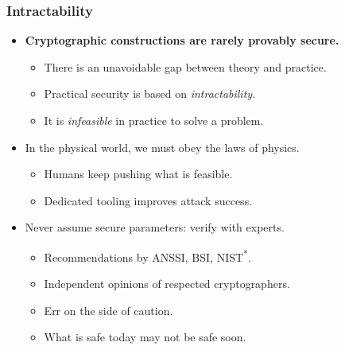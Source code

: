 \begin{frame}
  \frametitle{Intractability}

  \begin{itemize}
    \item \textbf{Cryptographic constructions are rarely provably secure.}
    \pause
    \begin{itemize}[<+->]
      \item There is an unavoidable gap between theory and practice.
      \item Practical security is based on \emph{intractability}.
      \item It is \emph{infeasible} in practice to solve a problem.
    \end{itemize}

    \vspace*{1em}

    \pause
    \item In the physical world, we must obey the laws of physics.
    \begin{itemize}
      \item Humans keep pushing what is feasible.
      \item Dedicated tooling improves attack success.
    \end{itemize}
    
    \vspace*{1em}

    \pause
    \item Never assume secure parameters: verify with experts.
    \begin{itemize}[<+->]
      \item Recommendations by ANSSI, BSI, NIST\textsuperscript{*}.
      \item Independent opinions of respected cryptographers.
      \item Err on the side of caution.
      \item What is safe today may not be safe soon.
    \end{itemize}
  \end{itemize}
\end{frame}

